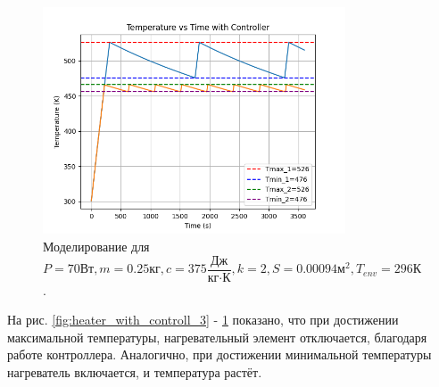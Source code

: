 \begin{figure}[h]  %
	\centering
	\includegraphics[width=0.8\textwidth]{imgs/heater_w._controll_1.png}  %
	\caption{Моделирование для 
		\[
		P=70\text{Вт}, m = 0.25\text{кг}, c=375\frac{\text{Дж}}{\text{кг}\cdot\text{К}},k = 2, S = 0.00094 \text{м}^2,T_{env}= 296 \text{К}
		\].}  %
	\label{fig:heater_with_controll_1}  
\end{figure}
\newpage
На рис. \ref{fig:heater_with_controll_3} -  \ref{fig:heater_with_controll_1} показано, что при достижении максимальной температуры, нагревательный элемент отключается, благодаря работе контроллера. Аналогично, при достижении минимальной температуры нагреватель включается, и температура растёт.